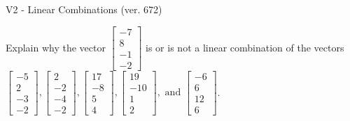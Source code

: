 \begin{exercise}
  \begin{exerciseTitle}V2 - Linear Combinations (ver. 672)\end{exerciseTitle}
  \begin{exerciseStatement}
    Explain why the vector \(\left[\begin{array}{c}
-7 \\
8 \\
-1 \\
-2
\end{array}\right]\)  is or is not a linear 
	combination of the vectors \(\left[\begin{array}{c}
-5 \\
2 \\
-3 \\
-2
\end{array}\right] , \left[\begin{array}{c}
2 \\
-2 \\
-4 \\
-2
\end{array}\right] , \left[\begin{array}{c}
17 \\
-8 \\
5 \\
4
\end{array}\right] , \left[\begin{array}{c}
19 \\
-10 \\
1 \\
2
\end{array}\right] , \text{ and } \left[\begin{array}{c}
-6 \\
6 \\
12 \\
6
\end{array}\right]\).
	



\end{exerciseStatement}
\end{exercise}
